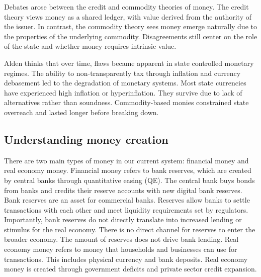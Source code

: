 Debates arose between the credit and commodity theories of money. The credit theory views money as a shared ledger, with value derived from the authority of the issuer. In contrast, the commodity theory sees money emerge naturally due to the properties of the underlying commodity. Disagreements still center on the role of the state and whether money requires intrinsic value.

Alden thinks that over time, flaws became apparent in state controlled monetary regimes. The ability to non-transparently tax through inflation and currency debasement led to the degradation of monetary systems. Most state currencies have experienced high inflation or hyperinflation. They survive due to lack of alternatives rather than soundness. Commodity-based monies constrained state overreach and lasted longer before breaking down.

\subsection{Understanding money creation}

There are two main types of money in our current system: financial money and real economy money.
Financial money refers to bank reserves, which are created by central banks through quantitative easing (QE). The central bank buys bonds from banks and credits their reserve accounts with new digital bank reserves.
Bank reserves are an asset for commercial banks. Reserves allow banks to settle transactions with each other and meet liquidity requirements set by regulators.
Importantly, bank reserves do not directly translate into increased lending or stimulus for the real economy. There is no direct channel for reserves to enter the broader economy. The amount of reserves does not drive bank lending.
Real economy money refers to money that households and businesses can use for transactions. This includes physical currency and bank deposits.
Real economy money is created through government deficits and private sector credit expansion.
